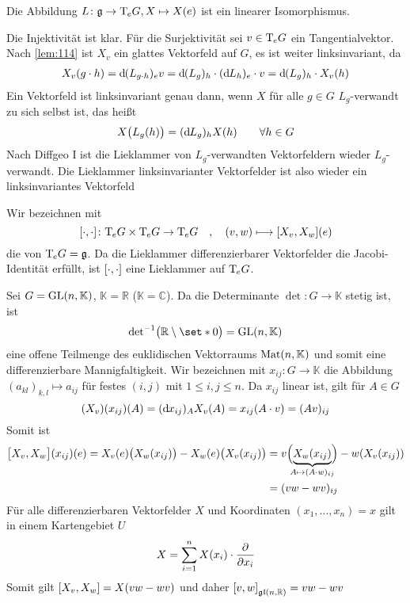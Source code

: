 \begin{korollar}
	Die Abbildung $L \colon \mathfrak{g} \to \Tmap_e G, X \mapsto X(e)$ ist ein linearer Isomorphismus.
\end{korollar}
\begin{beweis}
	Die Injektivität ist klar.
	Für die Surjektivität sei $v \in \Tmap_e G$ ein Tangentialvektor.
	Nach \autoref{lem:114} ist $X_v$ ein glattes Vektorfeld auf $G$, es ist weiter linksinvariant, da
	\begin{align}
		X_v(g \cdot h) = \mathd(L_{g \cdot h})_e v = \mathd(L_g)_h \cdot (\mathd L_h)_e \cdot v = \mathd (L_g)_h \cdot X_v(h)
	\end{align}
	Ein Vektorfeld ist linksinvariant genau dann, wenn $X$ für alle $g \in G$ $L_g$-verwandt zu sich selbst ist, das heißt
	\[
		X \enbrace[\big]{L_g(h)} = (\mathd L_g)_h X(h) \qquad  \forall h \in G
	\]
	Nach Diffgeo I ist die Lieklammer von $L_g$-verwandten Vektorfeldern wieder $L_g$-verwandt.
	Die Lieklammer linksinvarianter Vektorfelder ist also wieder ein linksinvariantes Vektorfeld
\end{beweis}

\begin{definition}[{name=[Lieklammer der Liealgebra]}]
	Wir bezeichnen mit 
	\[
		\benbrace*{\cdot ,\cdot } \colon \Tmap_e G \times \Tmap_e G \to \Tmap_e G \quad ,\quad  (v,w) \longmapsto \benbrace*{X_v,X_w}(e)
	\] 
	die  von $\Tmap_e G = \mathfrak{g}$.
	Da die Lieklammer differenzierbarer Vektorfelder die Jacobi-Identität erfüllt, ist $\benbrace*{\cdot ,\cdot }$ eine Lieklammer auf $\Tmap_e G$.
\end{definition}

Sei $G=\GL(n,\mathbb{K})$, $\mathbb{K}=\mathbb{R}$ ($\mathbb{K}=\mathbb{C}$).
Da die Determinante $\det \colon G \to \mathbb{K}$ stetig ist, ist 
\[
	{\det}^{-1} \enbrace[\big]{\mathbb{R}\setminus \set*{0}} = \GL(n,\mathbb{K}) 
\]
eine offene Teilmenge des euklidischen Vektorraums $\Mat(n,\mathbb{K})$ und somit eine differenzierbare Mannigfaltigkeit.
Wir bezeichnen mit $x_{ij} \colon G \to \mathbb{K}$ die Abbildung $(a_{kl})_{k,l} \mapsto a_{ij}$ für festes $(i,j)$ mit $1\le i,j\le n$.
Da $x_{ij}$ linear ist, gilt für $A \in G$
\[
	(X_v)(x_{ij})(A) = (\mathd x_{ij})_A X_v(A) = x_{ij}(A \cdot v) = (A v)_{ij}
\]
Somit ist
\begin{align}
	\benbrace[\big]{X_v,X_w}(x_{ij})(e) = X_v(e) \enbrace[\big]{X_w(x_{ij})} - X_w(e) \enbrace[\big]{X_v(x_{ij})} &= v \enbrace[\Big]{\Underbrace{X_w(x_{ij})}{\mathclap{A \mapsto (A \cdot w)_{ij}}}} - w \enbrace*{X_v(x_{ij})} \\
	&= (v w- w v)_{ij}
\end{align}
Für alle differenzierbaren Vektorfelder $X$ und Koordinaten $(x_1, \ldots ,x_n)=x$  gilt in einem Kartengebiet $U$
\[
	X = \sum_{i=1}^{n} X(x_i) \cdot \diff{}{x_i}
\]
Somit gilt $\benbrace*{X_v,X_w} =X(vw -wv)$ und daher $\benbrace*{v,w}_{\mathfrak{gl}(n,\mathbb{R})}=vw -wv$

